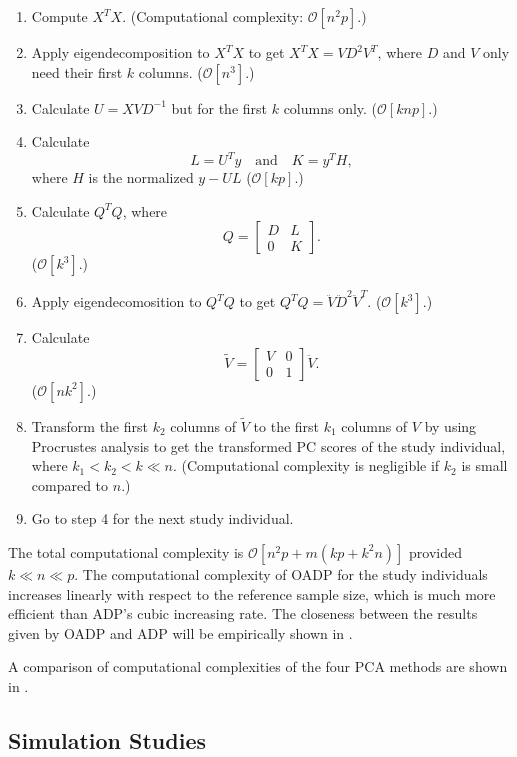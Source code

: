\documentclass{article}
\newcommand{\bO}{\mathcal{O}}
\begin{document}
\begin{enumerate}
\item Compute $X^T X$.
  (Computational complexity: $\bO[n^2p]$.)  
\item Apply eigendecomposition to $X^T X$ to get $X^T X = V D^2 V^T$,
  where $D$ and $V$ only need their first $k$ columns.
  ($\bO[n^3]$.)
\item Calculate $U = X V D^{-1}$ but for the first $k$ columns only.
  ($\bO[k n p]$.)
\item Calculate 
  \[
    L = U^T y \quad \text{and} \quad K = y^T H,
  \]
  where $H$ is the normalized  $y - UL$
  ($\bO[k p]$.)
\item Calculate $Q^T Q$, where
  \[
    Q = 
    \begin{bmatrix}
      D & L \\
      0 & K
    \end{bmatrix}.
  \]
  ($\bO[k^3]$.)
\item Apply eigendecomosition to $Q^T Q$ to get $Q^T Q = \ddot{V} \ddot{D}^2 \ddot{V}^T$.
  ($\bO[k^3]$.)
\item Calculate
  \[
    \tilde{V} =
    \begin{bmatrix}
      V & 0 \\
      0 & 1
    \end{bmatrix}
    \ddot{V}.
  \]
  ($\bO[nk^2]$.)
\item Transform the first $k_2$ columns of $\tilde{V}$ to the first $k_1$ columns of $V$ by using Procrustes analysis to get the transformed PC scores of the study individual,
  where $k_1 < k_2  < k \ll n$.
  (Computational complexity is negligible if $k_2$ is small compared to $n$.)
  \item Go to step 4 for the next study individual.
\end{enumerate}

The total computational complexity is $\bO[n^2p + m(kp + k^2n)]$
provided $k \ll n \ll p$.
The computational complexity of OADP for the study individuals increases linearly with respect to the reference sample size,
which is much more efficient than ADP's cubic increasing rate.
The closeness between the results given by OADP and ADP
will be empirically shown in .

A comparison of computational complexities of the four PCA methods are shown in .

\subsection{Simulation Studies}
\end{document}
